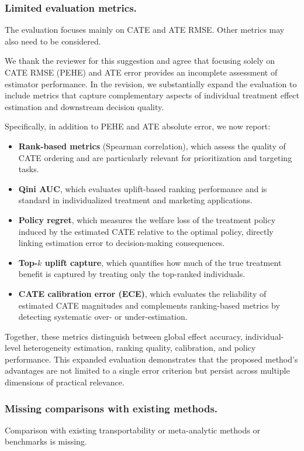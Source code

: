 \subsubsection{Limited evaluation metrics.}  
The evaluation focuses mainly on CATE and ATE RMSE. Other metrics may also need to be considered.

{\color{blue}

We thank the reviewer for this suggestion and agree that focusing solely on CATE RMSE (PEHE) and ATE error provides an incomplete assessment of estimator performance. In the revision, we substantially expand the evaluation to include metrics that capture complementary aspects of individual treatment effect estimation and downstream decision quality.

Specifically, in addition to PEHE and ATE absolute error, we now report:
\begin{itemize}
\item \textbf{Rank-based metrics} (Spearman correlation), which assess the quality of CATE ordering and are particularly relevant for prioritization and targeting tasks.
\item \textbf{Qini AUC}, which evaluates uplift-based ranking performance and is standard in individualized treatment and marketing applications.
\item \textbf{Policy regret}, which measures the welfare loss of the treatment policy induced by the estimated CATE relative to the optimal policy, directly linking estimation error to decision-making consequences.
\item \textbf{Top-$k$ uplift capture}, which quantifies how much of the true treatment benefit is captured by treating only the top-ranked individuals.
\item \textbf{CATE calibration error (ECE)}, which evaluates the reliability of estimated CATE magnitudes and complements ranking-based metrics by detecting systematic over- or under-estimation.
\end{itemize}

Together, these metrics distinguish between global effect accuracy, individual-level heterogeneity estimation, ranking quality, calibration, and policy performance. This expanded evaluation demonstrates that the proposed method’s advantages are not limited to a single error criterion but persist across multiple dimensions of practical relevance.
}


\subsubsection{Missing comparisons with existing methods.}  
Comparison with existing transportability or meta-analytic methods or benchmarks is missing.

